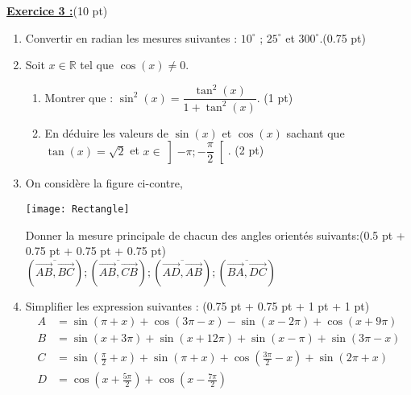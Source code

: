 \documentclass[12pt,a4paper]{article}
\begin{document}
\underline{\large\textbf{Exercice 3 :}}(10 pt)
\begin{enumerate}
	\item Convertir en radian les mesures suivantes : $10^\circ$ ; $25^\circ$ et $300^\circ$.(0.75 pt)
	\item Soit $x\in\mathbb{R}$ tel que $\cos(x) \neq 0$.
		\begin{enumerate}
			\item Montrer que : $\sin^2(x) = \dfrac{\tan^2(x)}{1 + \tan^2(x)}$. (1 pt)
			\item En déduire les valeurs de $\sin(x)$ et $\cos(x)$ sachant que $\tan(x) = \sqrt{2}$ et $x\in\left]-\pi;-\dfrac{\pi}{2}\right[$. (2 pt)
		\end{enumerate}
	\item On considère la figure ci-contre,
		\begin{center}
			\texttt{[image: Rectangle]}
		\end{center}
		Donner la mesure principale de chacun des angles orientés suivants:(0.5 pt + 0.75 pt + 0.75 pt + 0.75 pt) \\
		\(
\left( \overline{\overrightarrow{AB}, \overrightarrow{BC}} \right) ; \left( \overline{\overrightarrow{AB}, \overrightarrow{CB}} \right) ; \left( \overline{\overrightarrow{AD}, \overrightarrow{AB}} \right) ; \left( \overline{\overrightarrow{BA}, \overrightarrow{DC}} \right)
\)
	\item Simplifier les expression suivantes : (0.75 pt + 0.75 pt + 1 pt + 1 pt)
	\begin{align*}
A &= \sin(\pi + x) + \cos(3\pi - x) - \sin(x - 2\pi) + \cos(x + 9\pi) \\
B &= \sin(x + 3\pi) + \sin(x + 12\pi) + \sin(x - \pi) + \sin(3\pi - x) \\
C &= \sin\left(\frac{\pi}{2} + x\right) + \sin(\pi + x) + \cos\left(\frac{3\pi}{2} - x\right) + \sin(2\pi + x) \\
D &= \cos\left(x + \frac{5\pi}{2}\right) + \cos\left(x - \frac{7\pi}{2}\right)
\end{align*}

\end{enumerate}
\end{document}
